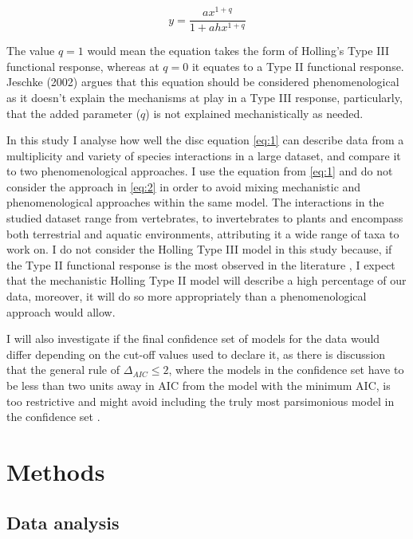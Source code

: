 \documentclass[11pt]{article}
\begin{document}
  \begin{linenomath*}
    \begin{equation}
      y=\frac{ax^{1+q}}{1+ahx^{1+q}}\label{eq:2}
    \end{equation}
  \end{linenomath*}
  
  The value $q=1$ would mean the equation takes the form of Holling’s Type III functional response, whereas at $q=0$ it equates to a Type II functional response. Jeschke (2002) \cite{Jeschke2002} argues that this equation should be considered phenomenological as it doesn’t explain the mechanisms at play in a Type III response, particularly, that the added parameter ($q$) is not explained mechanistically as needed. 
  
  In this study I analyse how well the disc equation \eqref{eq:1} can describe data from a multiplicity and variety of species interactions in a large dataset, and compare it to two phenomenological approaches. I use the equation from \eqref{eq:1} and do not consider the approach in \eqref{eq:2} in order to avoid mixing mechanistic and phenomenological approaches within the same model. The interactions in the studied dataset range from vertebrates, to invertebrates to plants and encompass both terrestrial and aquatic environments, attributing it a wide range of taxa to work on. I do not consider the Holling Type III model in this study because, if the Type II functional response is the most observed in the literature \cite{Jeschke2002}, I expect that the mechanistic Holling Type II model will describe a high percentage of our data, moreover, it will do so more appropriately than a phenomenological approach would allow. 
  
  I will also investigate if the final confidence set of models for the data would differ depending on the cut-off values used to declare it, as there is discussion that the general rule of $\Delta_{AIC}\leq2$, where the models in the confidence set have to be less than two units away in AIC from the model with the minimum AIC, is too restrictive and might avoid including the truly most parsimonious model in the confidence set \cite{Richards2008, Richards2011}.

  \section{Methods}
    \subsection{Data analysis}
    
\end{document}
